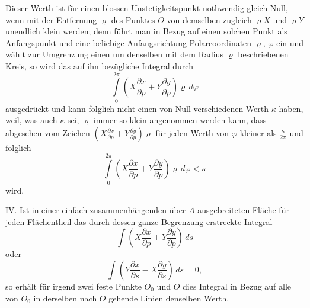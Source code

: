 \documentclass[a4paper,12pt]{article}
\begin{document}
Dieser Werth ist f\"{u}r einen blossen Unstetigkeitspunkt
nothwendig gleich Null, wenn mit der Entfernung $\varrho$ des
Punktes $O$ von demselben zugleich $\varrho X$ und $\varrho Y$
unendlich klein werden; denn f\"{u}hrt man in Bezug auf einen
solchen Punkt als Anfangspunkt und eine beliebige Anfangsrichtung
Polarcoordinaten $\varrho$, $\varphi$ ein und w\"{a}hlt zur
Umgrenzung einen um denselben mit dem Radius $\varrho$
beschriebenen Kreis, so wird das auf ihn bez\"{u}gliche Integral
durch
\[ \int\limits_{0}^{2\pi} \left(
            X \frac{\partial x}{\partial p}
          + Y \frac{\partial y}{\partial p}
         \right) \varrho \, d\varphi \]
ausgedr\"{u}ckt und kann folglich nicht einen von Null
verschiedenen Werth $\kappa$ haben, weil, was auch $\kappa$ sei,
$\varrho$ immer so klein angenommen werden kann, dass abgesehen
vom Zeichen
$\displaystyle \left(
            X \frac{\partial x}{\partial p}
          + Y \frac{\partial y}{\partial p}
         \right) \varrho$
f\"{u}r jeden Werth von $\varphi$ kleiner als
$\displaystyle \frac{\kappa}{2\pi}$
und folglich
\[ \int\limits_{0}^{2\pi} \left(
            X \frac{\partial x}{\partial p}
          + Y \frac{\partial y}{\partial p}
         \right) \varrho \, d\varphi
   < \kappa \]
wird.

IV.  Ist in einer einfach zusammenh\"{a}ngenden \"{u}ber $A$
ausgebreiteten Fl\"{a}che f\"{u}r jeden Fl\"{a}chentheil das
durch dessen ganze Begrenzung erstreckte Integral
\[ \int  \left(
            X \frac{\partial x}{\partial p}
          + Y \frac{\partial y}{\partial p}
         \right) \, ds \]
oder
\[ \int  \left(
            Y \frac{\partial x}{\partial s}
          - X \frac{\partial y}{\partial s}
         \right) \, ds
   = 0,\]
so erh\"{a}lt f\"{u}r irgend zwei feste Punkte $O_0$ und $O$ dies
Integral in Bezug auf alle von $O_0$ in derselben nach $O$
gehende Linien denselben Werth.
\end{document}
